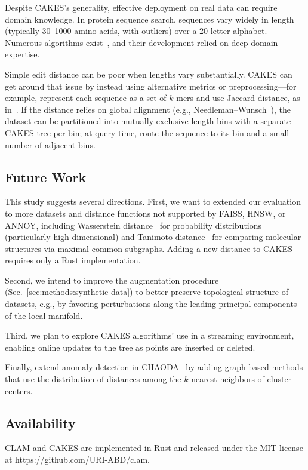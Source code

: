 Despite CAKES’s generality, effective deployment on real data can require domain knowledge. In protein sequence search, sequences vary widely in length (typically 30–1000 amino acids, with outliers) over a 20-letter alphabet. Numerous algorithms exist~\cite{kim2021entrance, daniels2013compressive, yu2015entropy, steinegger2018clustering}, and their development relied on deep domain expertise.

Simple edit distance can be poor when lengths vary substantially. CAKES can get around that issue by instead using alternative metrics or preprocessing—for example, represent each sequence as a set of $k$-mers and use Jaccard distance, as in~\cite{kim2021entrance}. If the distance relies on global alignment (e.g., Needleman–Wunsch~\cite{needleman1970general}), the dataset can be partitioned into mutually exclusive length bins with a separate CAKES tree per bin; at query time, route the sequence to its bin and a small number of adjacent bins.


\subsection{Future Work}

This study suggests several directions. First, we want to extended our evaluation to more datasets and distance functions not supported by FAISS, HNSW, or ANNOY, including Wasserstein distance~\cite{vallender1974calculation} for probability distributions (particularly high-dimensional) and Tanimoto distance~\cite{bajusz2015tanimoto} for comparing molecular structures via maximal common subgraphs. Adding a new distance to CAKES requires only a Rust implementation.

Second, we intend to improve the augmentation procedure (Sec.~\ref{sec:methods:synthetic-data}) to better preserve topological structure of datasets, e.g., by favoring perturbations along the leading principal components of the local manifold.

Third, we plan to explore CAKES algorithms' use in a streaming environment, enabling online updates to the tree as points are inserted or deleted. 

Finally, extend anomaly detection in CHAODA~\cite{ishaq2021clustered} by adding graph-based methods that use the distribution of distances among the $k$ nearest neighbors of cluster centers.

\subsection{Availability}

CLAM and CAKES are implemented in Rust and released under the MIT license at https://github.com/URI-ABD/clam.
